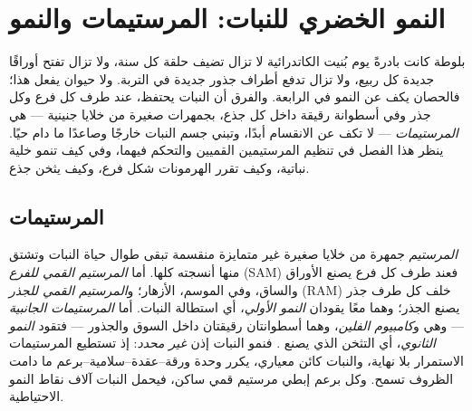 \chapter{النمو الخضري للنبات: المرستيمات والنمو}\label{ch:b2:plant-meristems}

بلوطة كانت بادرةً يوم بُنيت الكاتدرائية لا تزال
تضيف حلقة  كل سنة، ولا تزال تفتح أوراقًا جديدة كل
ربيع، ولا تزال تدفع أطراف جذور جديدة في التربة. ولا حيوان يفعل
هذا؛ فالحصان يكف عن النمو في الرابعة. والفرق أن النبات
يحتفظ، عند طرف كل فرع وكل جذر وفي أسطوانة
رقيقة داخل كل جذع، بجمهرات صغيرة من خلايا جنينية
--- هي \emph{المرستيمات} --- لا تكف عن الانقسام أبدًا، وتبني
جسم النبات خارجًا وصاعدًا ما دام حيًا. ينظر
هذا الفصل في تنظيم المرستيمين القميين والتحكم فيهما،
وفي كيف تنمو خلية نباتية، وكيف تقرر الهرمونات شكل
فرع، وكيف يثخن جذع.

\section{المرستيمات}

\begin{definition}\label{def:b2:plant-meristems:meristem}
\emph{المرستيم} جمهرة من خلايا صغيرة غير متمايزة
منقسمة تبقى طوال حياة النبات وتشتق
منها أنسجته كلها. أما \emph{المرستيم القمي للفرع} (SAM)
فعند طرف كل فرع يصنع الأوراق والساق، وفي الموسم، الأزهار؛
و\emph{المرستيم القمي للجذر} (RAM) خلف كل طرف جذر يصنع
الجذر؛ وهما معًا يقودان \emph{النمو الأولي}، أي استطالة
النبات. أما \emph{المرستيمات الجانبية} --- وهي \emph{} و\emph{كامبيوم الفلين}، وهما أسطوانتان رقيقتان داخل السوق
والجذور --- فتقود \emph{النمو الثانوي}، أي التثخن الذي
يصنع  . فنمو النبات إذن \emph{غير محدد}:
إذ تستطيع المرستيمات الاستمرار بلا نهاية، والنبات كائن
معياري، يكرر وحدة ورقة--عقدة--سلامية--برعم ما دامت
الظروف تسمح. وكل برعم إبطي مرستيم قمي ساكن، فيحمل النبات
آلاف نقاط النمو الاحتياطية.
\end{definition}

